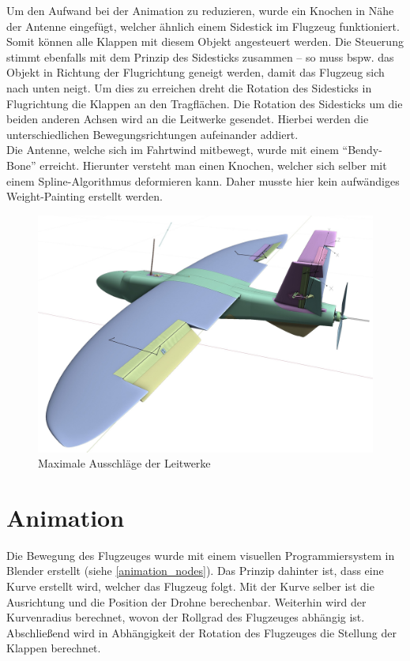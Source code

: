 Um den Aufwand bei der Animation zu reduzieren, wurde ein Knochen in Nähe der Antenne eingefügt, welcher ähnlich einem Sidestick im Flugzeug funktioniert. Somit können alle Klappen mit diesem Objekt angesteuert werden. Die Steuerung stimmt ebenfalls mit dem Prinzip des Sidesticks zusammen -- so muss bspw. das Objekt in Richtung der Flugrichtung geneigt werden, damit das Flugzeug sich nach unten neigt. Um dies zu erreichen dreht die Rotation des Sidesticks in Flugrichtung die Klappen an den Tragflächen. Die Rotation des Sidesticks um die beiden anderen Achsen wird an die Leitwerke gesendet. Hierbei werden die unterschiedlichen Bewegungsrichtungen aufeinander addiert. \\
Die Antenne, welche sich im Fahrtwind mitbewegt, wurde mit einem ``Bendy-Bone'' erreicht. Hierunter versteht man einen Knochen, welcher sich selber mit einem Spline-Algorithmus deformieren kann. Daher musste hier kein aufwändiges Weight-Painting erstellt werden.

\begin{figure}[H]
\begin{center}
\includegraphics[width=\textwidth]{gfx/prod/plane/plane8.jpg}
\caption{Maximale Ausschläge der Leitwerke}
\label{rigged_plane}
\end{center}
\end{figure}

\section{Animation}

Die Bewegung des Flugzeuges wurde mit einem visuellen Programmiersystem in Blender erstellt (siehe \autoref{animation_nodes}). Das Prinzip dahinter ist, dass eine Kurve erstellt wird, welcher das Flugzeug folgt. Mit der Kurve selber ist die Ausrichtung und die Position der Drohne berechenbar. Weiterhin wird der Kurvenradius berechnet, wovon der Rollgrad des Flugzeuges abhängig ist. Abschließend wird in Abhängigkeit der Rotation des Flugzeuges die Stellung der Klappen berechnet.

